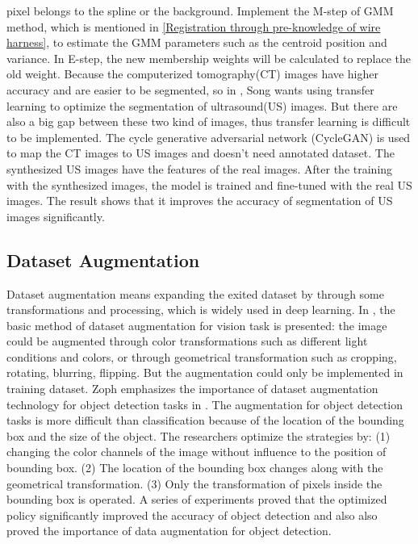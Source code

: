     pixel belongs to the spline or the background. Implement the M-step of GMM method, which is mentioned in \ref{Registration through pre-knowledge of wire harness}, to estimate the 
    GMM parameters such as the centroid position and variance. In E-step, the new membership weights will be calculated to replace the old weight. Because the computerized tomography(CT) 
    images have higher accuracy and are easier to be segmented, so in \cite{SONG2022106706}, Song wants using transfer learning to optimize the segmentation of ultrasound(US) images. But 
    there are also a big gap between these two kind of images, thus transfer learning is difficult to be implemented. The cycle generative adversarial network (CycleGAN) is used to map the 
    CT images to US images and doesn't need annotated dataset. The synthesized US images have the features of the real images. After the training with the synthesized images, the model is 
    trained and fine-tuned with the real US images. The result shows that it improves the accuracy of segmentation of US images significantly. 
\subsection{Dataset Augmentation}
    Dataset augmentation means expanding the exited dataset by through some transformations and processing, which is widely used in deep learning.
    In \cite{nesteruk2024image}, the basic method of dataset augmentation for vision task is presented: the image could be augmented through color transformations such as different 
    light conditions and colors, or through geometrical transformation such as cropping, rotating, blurring, flipping. But the augmentation could only be implemented in training dataset. 
    Zoph emphasizes the importance of dataset augmentation technology for object detection tasks in \cite{zoph2020learning}. The augmentation for object detection tasks is more difficult 
    than classification because of the location of the bounding box and the size of the object. The researchers optimize the strategies by: (1) changing the color channels of the image 
    without influence to the position of bounding box. (2) The location of the bounding box changes along with the geometrical transformation. (3) Only the transformation of pixels inside
    the bounding box is operated. A series of experiments proved that the optimized policy significantly improved the accuracy of object detection and also also proved the importance of data 
    augmentation for object detection.
